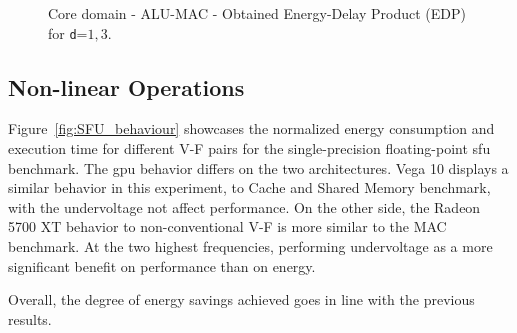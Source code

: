 \begin{figure}[!htb]
    \centering
    \begin{subfigmatrix}{2}
      \label{fig:MAC_EDP}
    \end{subfigmatrix}
    \caption{Core domain - ALU-MAC - Obtained Energy-Delay Product (EDP) for \texttt{d}=${1,3}$.}
\end{figure}

\newpage
\subsection{Non-linear Operations}

Figure~\ref{fig:SFU_behaviour} showcases the normalized energy consumption and execution time for different V-F pairs for the single-precision floating-point \acrshort{sfu} benchmark. The \acrshort{gpu} behavior differs on the two architectures. Vega 10 displays a similar behavior in this experiment, to Cache and Shared Memory benchmark, with the undervoltage not affect performance. On the other side, the Radeon 5700 XT behavior to non-conventional V-F is more similar to the MAC benchmark. At the two highest frequencies, performing undervoltage as a more significant benefit on performance than on energy.

Overall, the degree of energy savings achieved goes in line with the previous results.



